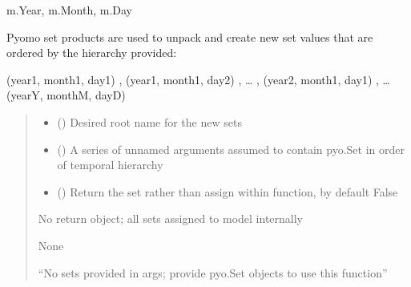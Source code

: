 \documentclass[letterpaper,10pt,english]{sphinxmanual}
\begin{document}
\begin{fulllineitems}
\begin{fulllineitems}
\sphinxAtStartPar
m.Year, m.Month, m.Day

\sphinxAtStartPar
Pyomo set products are used to unpack and create new set values that are ordered by the
hierarchy provided:

\sphinxAtStartPar
(year1, month1, day1) , (year1, month1, day2) , … , (year2, month1, day1) , … (yearY, monthM, dayD)
\begin{quote}\begin{description}
\begin{itemize}
\item {} 
\sphinxAtStartPar
{} () \textendash{} Desired root name for the new sets

\item {} 
\sphinxAtStartPar
{} () \textendash{} A series of unnamed arguments assumed to contain pyo.Set in order of temporal hierarchy

\item {} 
\sphinxAtStartPar
{} (\sphinxstyleliteralemphasis{\sphinxupquote{ | }}\sphinxstyleliteralemphasis{\sphinxupquote{, }}) \textendash{} Return the set rather than assign within function, by default False

\end{itemize}

\sphinxAtStartPar
No return object; all sets assigned to model internally

\sphinxAtStartPar
None

\sphinxAtStartPar
{} \textendash{} “No sets provided in args; provide pyo.Set objects to use this function”

\end{description}\end{quote}

\end{fulllineitems}



\end{fulllineitems}
\end{document}
